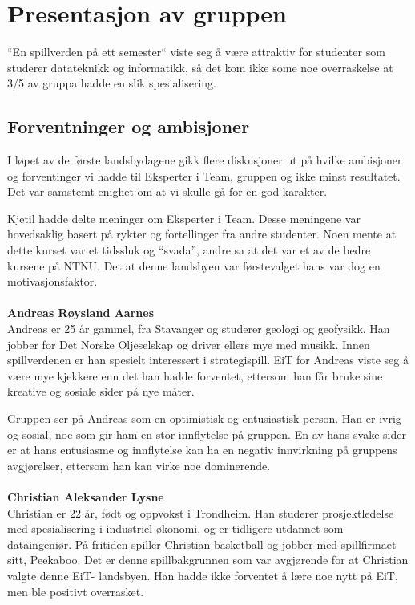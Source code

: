 \section{Presentasjon av gruppen}
``En spillverden på ett semester`` viste seg å være attraktiv for
studenter som studerer datateknikk og informatikk, så det kom ikke some
noe overraskelse at 3/5 av gruppa hadde en slik spesialisering.

\subsection{Forventninger og ambisjoner}
I løpet av de første landsbydagene gikk flere diskusjoner ut på hvilke
ambisjoner og forventinger vi hadde til Eksperter i Team, gruppen og
ikke minst resultatet. Det var samstemt enighet om at vi skulle gå for
en god karakter.

Kjetil hadde delte meninger om Eksperter i Team. Desse meningene var
hovedsaklig basert på rykter og fortellinger fra andre studenter. Noen
mente at dette kurset var et tidssluk og ``svada'', andre sa at det var
et av de bedre kursene på NTNU. Det at denne landsbyen var førstevalget
hans var dog en motivasjonsfaktor.
\\
\\
\textbf{Andreas Røysland Aarnes}\\
Andreas er 25 år gammel, fra Stavanger og studerer geologi og geofysikk. Han jobber for Det Norske Oljeselskap og driver ellers mye med musikk. Innen spillverdenen er han spesielt interessert i strategispill. EiT for Andreas viste seg å være mye kjekkere enn det han hadde forventet, ettersom han får bruke sine kreative og sosiale sider på nye måter. 

Gruppen ser på Andreas som en optimistisk og entusiastisk person. Han er
ivrig og sosial, noe som gir ham en stor innflytelse på gruppen. En av
hans svake sider er at hans entusiasme og innflytelse kan ha en negativ
innvirkning på gruppens avgjørelser, ettersom han kan virke noe
dominerende. \\\\
\textbf{Christian Aleksander Lysne}\\
Christian er 22 år, født og oppvokst i Trondheim. Han studerer prosjektledelse med spesialisering i industriel økonomi, og er tidligere utdannet som dataingeniør. På fritiden spiller Christian basketball og jobber med spillfirmaet sitt, Peekaboo. Det er denne spillbakgrunnen som var avgjørende for at Christian valgte denne EiT- landsbyen. Han hadde ikke forventet å lære noe nytt på EiT, men ble positivt overrasket.   

